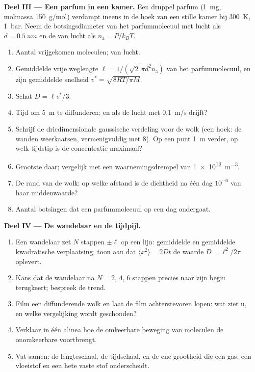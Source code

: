 \begin{problem}
\textbf{Deel III --- Een parfum in een kamer.}
Een druppel parfum (\qty{1}{mg}, molmassa \qty{150}{g/mol}) verdampt
ineens in de hoek van een stille kamer bij \qty{300}{K}, \qty{1}{bar}.
Neem de botsingsdiameter van het parfummolecuul met lucht als
$d =
\qty{0.5}{nm}$ en de  van lucht als
$n_{\text{a}} = P/k_BT$.
\begin{enumerate}[resume]
  \item Aantal vrijgekomen moleculen;  van lucht.
  \item Gemiddelde vrije weglengte $\ell = 1/(\sqrt2\,\pi d^2 n_{\text{a}})$ van het
        parfummolecuul, en zijn gemiddelde snelheid $v^* = \sqrt{8RT/\pi M}$.
  \item Schat $D = \ell v^*/3$.
  \item Tijd om \qty{5}{m} te diffunderen; en als de lucht met
        \qty{0.1}{m/s} drijft?
  \item Schrijf de driedimensionale gaussische verdeling voor de wolk (een hoek:
        de wanden weerkaatsen, vermenigvuldig met $8$). Op een punt
        \qty{1}{m} verder,
        op welk tijdstip is de concentratie maximaal?
  \item Grootste  daar; vergelijk met een
        waarnemingsdrempel van \qty{1e13}{m^{-3}}.
  \item De rand van de wolk: op welke afstand is de dichtheid na één dag $10^{-6}$
        van haar middenwaarde?
  \item Aantal botsingen dat een parfummolecuul op een dag ondergaat.
\end{enumerate}

\textbf{Deel IV --- De wandelaar en de tijdpijl.}
\begin{enumerate}[resume]
  \item Een wandelaar zet $N$ stappen $\pm\ell$ op een lijn: gemiddelde en
        gemiddelde
        kwadratische verplaatsing; toon aan dat $\langle x^2\rangle = 2Dt$
        de waarde $D = \ell^2/2\tau$ oplevert.
  \item Kans dat de wandelaar na $N = 2$, $4$, $6$ stappen precies naar zijn
        begin terugkeert; bespreek de trend.
  \item Film een diffunderende wolk en laat de film achterstevoren lopen:
        wat ziet u,
        en welke vergelijking wordt geschonden?
  \item Verklaar in één alinea hoe de omkeerbare beweging van moleculen
        de onomkeerbare  voortbrengt.
  \item Vat samen: de lengteschaal, de tijdschaal, en de ene
        grootheid die een gas, een vloeistof en een hete vaste stof onderscheidt.
\end{enumerate}
\end{problem}

